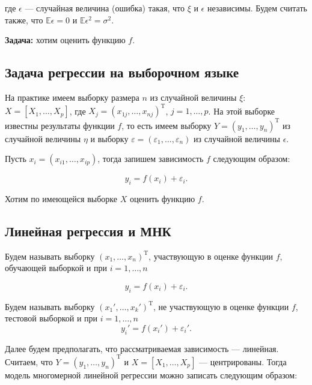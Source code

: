\documentclass[specialist,
               subf,href,colorlinks=true, 12pt,a4paper]{article} %
\newcommand{\E}{\mathbb{E}}
\newcommand{\T}{\mathrm{T}}
\numberwithin{equation}{section}
\begin{document}
где $\epsilon$ --- случайная величина (ошибка) такая, что $\xi$ и $\epsilon$ независимы. Будем считать также, что $\E\epsilon = 0$ и $\E \epsilon^2 = \sigma^2$.

\textbf{Задача:} хотим оценить функцию $f$.

\subsection{Задача регрессии на выборочном языке}

На практике имеем выборку размера $n$ из случайной величины $\xi$: $X = [X_1, \ldots, X_p]$, где $X_j = (x_{1j}, \ldots, x_{nj})^{\T}$, $j = 1, \ldots, p$. На этой выборке известны результаты функции $f$, то есть имеем выборку $Y = (y_1, \ldots , y_n)^{\T}$ из случайной величины $\eta$ и выборку $\varepsilon = (\varepsilon_1, \ldots , \varepsilon_n)$ из случайной величины $\epsilon$.

Пусть $x_i = (x_{i1}, \ldots, x_{ip})$, тогда запишем зависимость $f$ следующим образом:

\begin{equation*}
y_i = f(x_i) + \varepsilon_i.
\end{equation*}

Хотим по имеющейся выборке $X$ оценить функцию $f$.


\subsection{Линейная регрессия и МНК}

Будем называть выборку $(x_1, \ldots, x_n)^{\T}$, участвующую  в оценке функции $f$, обучающей выборкой и при $i = 1, \ldots, n$

\begin{equation*}
y_i = f(x_i) + \varepsilon_i.
\end{equation*} 

Будем называть выборку  $(x_1', \ldots, x_k')^{\T}$, не участвующую в оценке функции $f$, тестовой выборкой и при $i = 1, \ldots, n$
\begin{equation*}
y_i' = f(x_i') + \varepsilon_i'.
\end{equation*} 



Далее будем предполагать, что рассматриваемая зависимость --- линейная. Считаем, что $Y = (y_1, \ldots, y_n)^{\T}$ и $X = [X_1, \ldots ,X_p]$ --- центрированы. Тогда модель многомерной линейной регрессии можно записать следующим образом:
\end{document}
